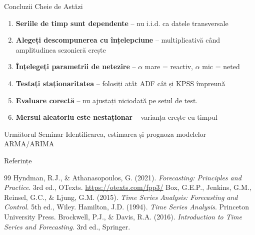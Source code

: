 \documentclass[9pt, aspectratio=169, t]{beamer}
\begin{document}
\begin{frame}{Concluzii Cheie de Astăzi}
    \begin{enumerate}
        \item \textbf{Seriile de timp sunt dependente} -- nu i.i.d. ca datele transversale

        \vspace{0.15cm}

        \item \textbf{Alegeți descompunerea cu înțelepciune} -- multiplicativă când amplitudinea sezonieră crește

        \vspace{0.15cm}

        \item \textbf{Înțelegeți parametrii de netezire} -- $\alpha$ mare = reactiv, $\alpha$ mic = neted

        \vspace{0.15cm}

        \item \textbf{Testați staționaritatea} -- folosiți atât ADF cât și KPSS împreună

        \vspace{0.15cm}

        \item \textbf{Evaluare corectă} -- nu ajustați niciodată pe setul de test.

        \vspace{0.15cm}

        \item \textbf{Mersul aleatoriu este nestaționar} -- varianța crește cu timpul
    \end{enumerate}

    \vspace{0.3cm}

    \begin{block}{Următorul Seminar}
        Identificarea, estimarea și prognoza modelelor ARMA/ARIMA
    \end{block}
\end{frame}

\begin{frame}{Referințe}
    \footnotesize
    \begin{thebibliography}{99}
         Hyndman, R.J., \& Athanasopoulos, G. (2021). \textit{Forecasting: Principles and Practice}. 3rd ed., OTexts. \url{https://otexts.com/fpp3/}
         Box, G.E.P., Jenkins, G.M., Reinsel, G.C., \& Ljung, G.M. (2015). \textit{Time Series Analysis: Forecasting and Control}. 5th ed., Wiley.
         Hamilton, J.D. (1994). \textit{Time Series Analysis}. Princeton University Press.
         Brockwell, P.J., \& Davis, R.A. (2016). \textit{Introduction to Time Series and Forecasting}. 3rd ed., Springer.
    \end{thebibliography}
\end{frame}
\end{document}
